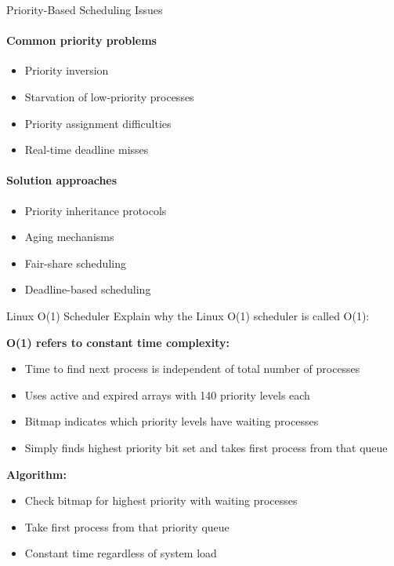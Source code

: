 \begin{KR}{Priority-Based Scheduling Issues}
    \paragraph{Common priority problems}
    \begin{itemize}
        \item Priority inversion
        \item Starvation of low-priority processes
        \item Priority assignment difficulties
        \item Real-time deadline misses
    \end{itemize}
    
    \paragraph{Solution approaches}
    \begin{itemize}
        \item Priority inheritance protocols
        \item Aging mechanisms
        \item Fair-share scheduling
        \item Deadline-based scheduling
    \end{itemize}
\end{KR}

\begin{example2}{Linux O(1) Scheduler}
    Explain why the Linux O(1) scheduler is called O(1):
    
    \tcblower
    
    \textbf{O(1) refers to constant time complexity:}
    \begin{itemize}
        \item Time to find next process is independent of total number of processes
        \item Uses active and expired arrays with 140 priority levels each
        \item Bitmap indicates which priority levels have waiting processes
        \item Simply finds highest priority bit set and takes first process from that queue
    \end{itemize}
    
    \textbf{Algorithm:}
    \begin{itemize}
        \item Check bitmap for highest priority with waiting processes
        \item Take first process from that priority queue
        \item Constant time regardless of system load
    \end{itemize}
\end{example2}

